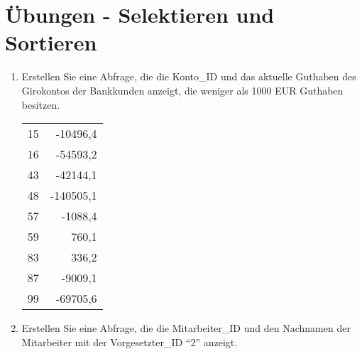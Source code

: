 \clearpage
    \section{Übungen - Selektieren und Sortieren}
      \begin{enumerate}
        \item Erstellen Sie eine Abfrage, die die Konto\_ID und das aktuelle
        Guthaben des Girokontos der Bankkunden anzeigt, die weniger als 1000 EUR
        Guthaben besitzen.
        \begin{center}
          \begin{small}
            \tablehead{}
            \begin{msoraclesql}
              \begin{supertabular}{rr}
                15 & -10496,4 \\
                16 & -54593,2 \\
                43 & -42144,1 \\
                48 & -140505,1 \\
                57 & -1088,4 \\
                59 & 760,1 \\
                83 & 336,2 \\
                87 & -9009,1 \\
                99 & -69705,6 \\
              \end{supertabular}
            \end{msoraclesql}
          \end{small}
        \end{center}
        \item Erstellen Sie eine Abfrage, die die Mitarbeiter\_ID und den
        Nachnamen der Mitarbeiter mit der Vorgesetzter\_ID \enquote{2} anzeigt.
        \begin{center}
          \begin{small}

\end{small}
\end{center}
\end{enumerate}
